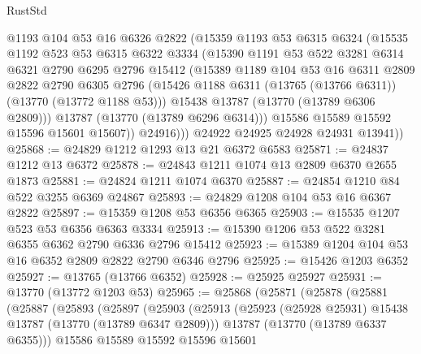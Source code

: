 \begin{lexlean}{RustStd}
\begin{coremodule}
              @1193
              @104
              @53
              @16
              @6326
              @2822
              (@15359
                @1193
                @53
                @6315
                @6324
                (@15535
                  @1192
                  @523
                  @53
                  @6315
                  @6322
                  @3334
                  (@15390
                    @1191
                    @53
                    @522
                    @3281
                    @6314
                    @6321
                    @2790
                    @6295
                    @2796
                    @15412
                    (@15389
                      @1189
                      @104
                      @53
                      @16
                      @6311
                      @2809
                      @2822
                      @2790
                      @6305
                      @2796
                      (@15426 @1188 @6311 (@13765 (@13766 @6311)) (@13770 (@13772 @1188 @53)))
                      @15438
                      @13787
                      (@13770 (@13789 @6306 @2809)))
                    @13787
                    (@13770 (@13789 @6296 @6314)))
                  @15586
                  @15589
                  @15592
                  @15596
                  @15601
                  @15607))
              @24916)))
        @24922
        @24925
        @24928
        @24931
        @13941))
@25868 := @24829 @1212 @1293 @13 @21 @6372 @6583
@25871 := @24837 @1212 @13 @6372
@25878 := @24843 @1211 @1074 @13 @2809 @6370 @2655 @1873
@25881 := @24824 @1211 @1074 @6370
@25887 := @24854 @1210 @84 @522 @3255 @6369 @24867
@25893 := @24829 @1208 @104 @53 @16 @6367 @2822
@25897 := @15359 @1208 @53 @6356 @6365
@25903 := @15535 @1207 @523 @53 @6356 @6363 @3334
@25913 := @15390 @1206 @53 @522 @3281 @6355 @6362 @2790 @6336 @2796 @15412
@25923 := @15389 @1204 @104 @53 @16 @6352 @2809 @2822 @2790 @6346 @2796
@25925 := @15426 @1203 @6352
@25927 := @13765 (@13766 @6352)
@25928 := @25925 @25927
@25931 := @13770 (@13772 @1203 @53)
@25965 := @25868
    (@25871
      (@25878
        (@25881
          (@25887
            (@25893
              (@25897
                (@25903
                  (@25913
                    (@25923 (@25928 @25931) @15438 @13787 (@13770 (@13789 @6347 @2809)))
                    @13787
                    (@13770 (@13789 @6337 @6355)))
                  @15586
                  @15589
                  @15592
                  @15596
                  @15601

\end{coremodule}
\end{lexlean}
